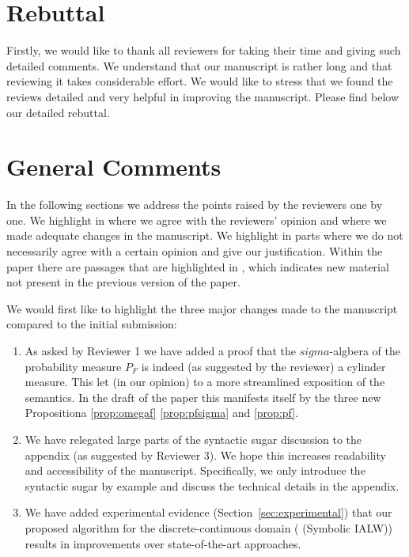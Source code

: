 



\section*{ \Huge Rebuttal}
Firstly, we would like to thank all reviewers for taking their time and giving such detailed comments. We understand that our manuscript is rather long and that reviewing it takes considerable effort. We would like to stress that we found the reviews detailed and very helpful in improving the manuscript. Please find below our detailed rebuttal.



\section*{General Comments}

In the following sections we address the points raised by the reviewers one by one. We highlight in  where we agree with the reviewers' opinion and where we made adequate changes in the manuscript. We highlight in  parts where we do not necessarily agree with a certain opinion and give our justification. Within the paper there are passages that are highlighted in , which indicates new material not present in the previous version of the paper.

We would first like to highlight the three major changes made to the manuscript compared to the initial submission:
\begin{enumerate}
    \item As asked by Reviewer 1 we have added a proof that the $sigma$-algbera of the probability measure $P_F$ is indeed (as suggested by the reviewer) a cylinder measure. This let (in our opinion) to a more streamlined exposition of the semantics. In the draft of the paper this manifests itself by the three new Propositiona \ref{prop:omegaf} \ref{prop:pfsigma} and \ref{prop:pf}.
    \item We have relegated large parts of the syntactic sugar discussion to the appendix (as suggested by Reviewer 3). We hope this increases readability and accessibility of the manuscript. Specifically, we only introduce the syntactic sugar by example and discuss the technical details in the appendix.
    \item We have added experimental evidence (\cf Section~\ref{sec:experimental}) that our proposed algorithm for the discrete-continuous domain ( (Symbolic IALW)) results in improvements over state-of-the-art approaches.
\end{enumerate}


